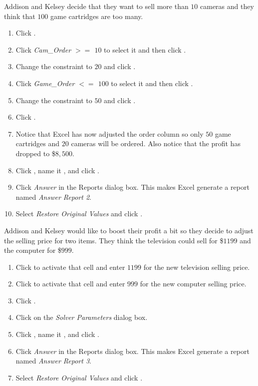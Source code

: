 Addison and Kelsey decide that they want to sell more than $ 10 $ cameras and they think that $ 100 $ game cartridges are too many. 

\begin{enumerate}
	\item Click .
	\item Click \textit{Cam\_Order $ >=$ $ 10 $} to select it and then click .
	\item Change the constraint to $ 20 $ and click .
	\item Click \textit{Game\_Order $ <=$ $ 100 $} to select it and then click .
	\item Change the constraint to $ 50 $ and click .
	\item Click .
	\item Notice that Excel has now adjusted the order column so only $ 50 $ game cartridges and $ 20 $ cameras will be ordered. Also notice that the profit has dropped to \$$ 8,500 $. 
	\item Click , name it , and click .
	\item Click \textit{Answer} in the Reports dialog box. This makes Excel generate a report named \textit{Answer Report 2}.
	\item Select \textit{Restore Original Values} and click .
\end{enumerate}

Addison and Kelsey would like to boost their profit a bit so they decide to adjust the selling price for two items. They think the television could sell for \$$ 1199 $ and the computer for \$$ 999 $. 

\begin{enumerate}
	\item Click  to activate that cell and enter $ 1199 $ for the new television selling price.
	\item Click  to activate that cell and enter $ 999 $ for the new computer selling price.
	\item Click .
	\item Click  on the \textit{Solver Parameters} dialog box.
	\item Click , name it , and click .
	\item Click \textit{Answer} in the Reports dialog box. This makes Excel generate a report named \textit{Answer Report 3}.
	\item Select \textit{Restore Original Values} and click .
\end{enumerate}

